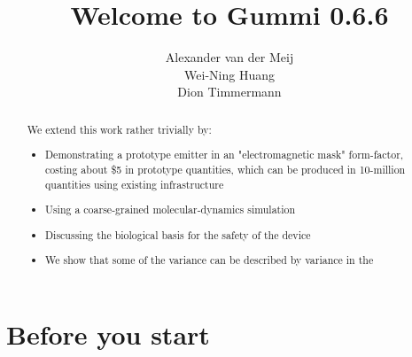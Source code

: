 \documentclass[11pt]{article}
\title{\textbf{Welcome to Gummi 0.6.6}}
\author{Alexander van der Meij\\
		Wei-Ning Huang\\
		Dion Timmermann}
\date{}
\begin{document}
\maketitle

\begin{abstract}
We extend this work rather trivially by:
\begin{itemize}
  \item Demonstrating a prototype emitter in an "electromagnetic mask" form-factor, costing about \$5 in prototype quantities, which can be produced in 10-million quantities using existing infrastructure  
  \item Using a coarse-grained molecular-dynamics simulation 
  \item Discussing the biological basis for the safety of the device
  \item We show that some of the variance can be described by variance in the 
\end{itemize}
\end{abstract}

\section{Before you start}
\end{document}
